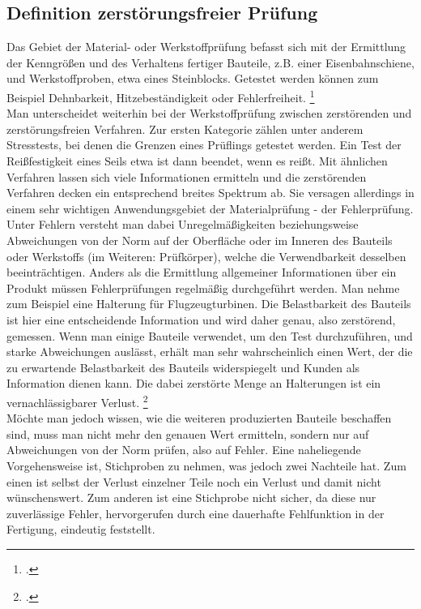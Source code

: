 \documentclass[reducespace,stylepage,semiarbeit]{spezidoc}
\begin{document}
\subsection{Definition zerstörungsfreier Prüfung}
Das Gebiet der Material- oder Werkstoffprüfung befasst sich mit der Ermittlung der Kenngrößen und des Verhaltens fertiger Bauteile, z.B. einer Eisenbahnschiene, und Werkstoffproben, etwa eines Steinblocks. 
Getestet werden können zum Beispiel Dehnbarkeit, Hitzebeständigkeit oder Fehlerfreiheit. \footcite{theorie}\\ 
Man unterscheidet weiterhin bei der Werkstoffprüfung zwischen zerstörenden und zerstörungsfreien Verfahren. 
Zur ersten Kategorie zählen unter anderem Stresstests, bei denen die Grenzen eines Prüflings getestet werden. 
Ein Test der Reißfestigkeit eines Seils etwa ist dann beendet, wenn es reißt. 
Mit ähnlichen Verfahren lassen sich viele Informationen ermitteln und die zerstörenden Verfahren decken ein entsprechend breites Spektrum ab. 
Sie versagen allerdings in einem sehr wichtigen Anwendungsgebiet der Materialprüfung - der Fehlerprüfung.\\
Unter Fehlern versteht man dabei Unregelmäßigkeiten beziehungsweise Abweichungen von der Norm auf der Oberfläche oder im Inneren des Bauteils oder Werkstoffs (im Weiteren: Prüfkörper), welche die Verwendbarkeit desselben beeinträchtigen. 
Anders als die Ermittlung allgemeiner Informationen über ein Produkt müssen Fehlerprüfungen regelmäßig durchgeführt werden. 
Man nehme zum Beispiel eine Halterung für Flugzeugturbinen. 
Die Belastbarkeit des Bauteils ist hier eine entscheidende Information und wird daher genau, also zerstörend, gemessen.
Wenn man einige Bauteile verwendet, um den Test durchzuführen, und starke Abweichungen auslässt, erhält man sehr wahrscheinlich einen Wert, der die zu erwartende Belastbarkeit des Bauteils widerspiegelt und Kunden als Information dienen kann.
Die dabei zerstörte Menge an Halterungen ist ein vernachlässigbarer Verlust. \footcite{zfp-abgrenzung}\\
Möchte man jedoch wissen, wie die weiteren produzierten Bauteile beschaffen sind, muss man nicht mehr den genauen Wert ermitteln, sondern nur auf Abweichungen von der Norm prüfen, also auf Fehler. 
Eine naheliegende Vorgehensweise ist, Stichproben zu nehmen, was jedoch zwei Nachteile hat. Zum einen ist selbst der Verlust einzelner Teile noch ein Verlust und damit nicht wünschenswert.
Zum anderen ist eine Stichprobe nicht sicher, da diese nur zuverlässige Fehler, hervorgerufen durch eine dauerhafte Fehlfunktion in der Fertigung, eindeutig feststellt.\\
\end{document}
